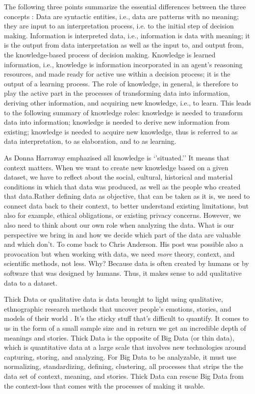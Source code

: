 \documentclass[
]{book}
\begin{document}
The following three points summarize the essential differences between the three concepts \citep{aamodt1995datainformationknowledge}:
Data are syntactic entities, i.e., data are patterns with no meaning; they are input to an interpretation process, i.e.
to the initial step of decision making. Information is interpreted data, i.e., information is data with meaning; it is the output from data interpretation as well as the input to, and output from, the knowledge-based process of decision making. Knowledge is learned information, i.e., knowledge is information incorporated in an agent's reasoning resources, and made ready for active use within a decision process; it is the output of a learning process. The role of knowledge, in general, is therefore to play the active part in the processes of transforming data into information, deriving other information, and acquiring new knowledge, i.e., to learn. This leads to the following summary of knowledge roles: knowledge is needed to transform data into information; knowledge is needed to derive new information from existing; knowledge is needed to acquire new knowledge, thus is referred to as data interpretation, to as elaboration, and to as learning.

As Donna Harraway emphazised all knowledge is `'situated.'' \citep{haraway1988situated} It means that context matters. When we want to create new knowledge based on a given dataset, we have to reflect about the social, cultural, historical and material conditions in which that data was produced, as well as the people who created that data.Rather defining data as objective, that can be taken as it is, we need to connect data back to their context, to better understand existing limitations, but also for example, ethical obligations, or existing privacy concerns. However, we also need to think about our own role when analyzing the data. What is our perspective we bring in and how we decide which part of the data are valuable and which don't. To come back to Chris Anderson. His post was possible also a provocation but when working with data, we need \emph{more} theory, context, and scientific methods, not less. Why? Because data is often created by humans or by software that was designed by humans. Thus, it makes sense to add qualitative data to a dataset.

Thick Data or qualitative data is data brought to light using qualitative, ethnographic research methods that uncover people's emotions, stories, and models of their world \citep{wang2016bigdata}. It's the sticky stuff that's difficult to quantify. It comes to us in the form of a small sample size and in return we get an incredible depth of meanings and stories. Thick Data is the opposite of Big Data (or thin data), which is quantitative data at a large scale that involves new technologies around capturing, storing, and analyzing. For Big Data to be analyzable, it must use normalizing, standardizing, defining, clustering, all processes that strips the the data set of context, meaning, and stories. Thick Data can rescue Big Data from the context-loss that comes with the processes of making it usable.
\end{document}
